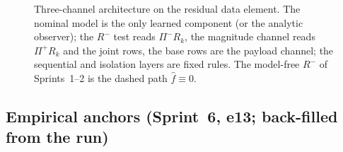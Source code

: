 \begin{figure}[ht]
{\begin{tikzpicture}
\end{tikzpicture}}
\caption{Three-channel architecture on the residual data element. The
nominal model is the only learned component (or the analytic observer); the
$R^{-}$ test reads $\Pi^{-}R_k$, the magnitude channel reads $\Pi^{+}R_k$ and
the joint rows, the base rows are the payload channel; the sequential and
isolation layers are fixed rules. The model-free $R^{-}$ of Sprints~1--2 is
the dashed path $\hat f \equiv 0$.}
\label{fig:architecture}
\end{figure}

\subsection{Empirical anchors (Sprint~6, e13; back-filled from the run)}
\label{sec:p2-anchors}

